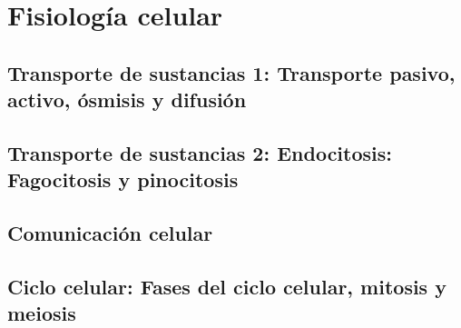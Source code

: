 \documentclass{AsignaturaResumen}
\begin{document}
\part{Fisiología celular}

    \chapter[Transporte de sustancias 1]{Transporte de sustancias 1: Transporte pasivo, activo, ósmisis y difusión} 
    \chapter[Transporte de sustancias 2]{Transporte de sustancias 2: Endocitosis: Fagocitosis y pinocitosis} 
    \chapter{Comunicación celular}  
    \chapter[Ciclo celular]{Ciclo celular: Fases del ciclo celular, mitosis y meiosis} 


    \appendix{}

    \backmatter
    
\end{document}
